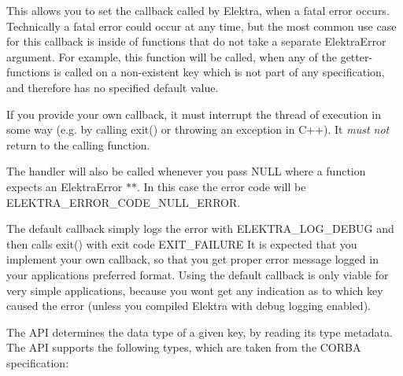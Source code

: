 This allows you to set the callback called by Elektra, when a fatal error occurs. Technically a fatal error could occur at any time, but the most common use case for this callback is inside of functions that do not take a separate {\ttfamily Elektra\+Error} argument. For example, this function will be called, when any of the getter-\/functions is called on a non-\/existent key which is not part of any specification, and therefore has no specified default value.

If you provide your own callback, it must interrupt the thread of execution in some way (e.\+g. by calling {\ttfamily exit()} or throwing an exception in C++). It {\itshape must not} return to the calling function.

The handler will also be called whenever you pass {\ttfamily N\+U\+LL} where a function expects an {\ttfamily Elektra\+Error $\ast$$\ast$}. In this case the error code will be {\ttfamily E\+L\+E\+K\+T\+R\+A\+\_\+\+E\+R\+R\+O\+R\+\_\+\+C\+O\+D\+E\+\_\+\+N\+U\+L\+L\+\_\+\+E\+R\+R\+OR}.

The default callback simply logs the error with {\ttfamily E\+L\+E\+K\+T\+R\+A\+\_\+\+L\+O\+G\+\_\+\+D\+E\+B\+UG} and then calls {\ttfamily exit()} with exit code {\ttfamily E\+X\+I\+T\+\_\+\+F\+A\+I\+L\+U\+RE} It is expected that you implement your own callback, so that you get proper error message logged in your applications preferred format. Using the default callback is only viable for very simple applications, because you won\textquotesingle{}t get any indication as to which key caused the error (unless you compiled Elektra with debug logging enabled).

The A\+PI determines the data type of a given key, by reading its {\ttfamily type} metadata. The A\+PI supports the following types, which are taken from the C\+O\+R\+BA specification\+:


